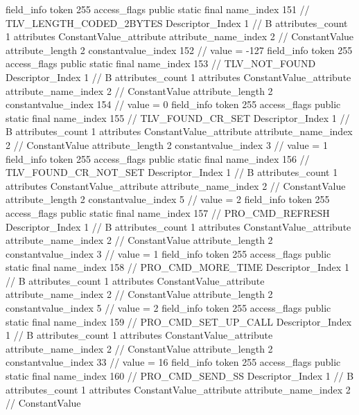 {{{{{{{				}
				}
			}
			field_info {
				token	255
				access_flags	public static final
				name_index	151		// TLV_LENGTH_CODED_2BYTES
				Descriptor_Index	1		// B
				attributes_count	1
				attributes {
				ConstantValue_attribute {
					attribute_name_index	2		// ConstantValue
					attribute_length	2
					constantvalue_index	152		// value = -127
				}
				}
			}
			field_info {
				token	255
				access_flags	public static final
				name_index	153		// TLV_NOT_FOUND
				Descriptor_Index	1		// B
				attributes_count	1
				attributes {
				ConstantValue_attribute {
					attribute_name_index	2		// ConstantValue
					attribute_length	2
					constantvalue_index	154		// value = 0
				}
				}
			}
			field_info {
				token	255
				access_flags	public static final
				name_index	155		// TLV_FOUND_CR_SET
				Descriptor_Index	1		// B
				attributes_count	1
				attributes {
				ConstantValue_attribute {
					attribute_name_index	2		// ConstantValue
					attribute_length	2
					constantvalue_index	3		// value = 1
				}
				}
			}
			field_info {
				token	255
				access_flags	public static final
				name_index	156		// TLV_FOUND_CR_NOT_SET
				Descriptor_Index	1		// B
				attributes_count	1
				attributes {
				ConstantValue_attribute {
					attribute_name_index	2		// ConstantValue
					attribute_length	2
					constantvalue_index	5		// value = 2
				}
				}
			}
			field_info {
				token	255
				access_flags	public static final
				name_index	157		// PRO_CMD_REFRESH
				Descriptor_Index	1		// B
				attributes_count	1
				attributes {
				ConstantValue_attribute {
					attribute_name_index	2		// ConstantValue
					attribute_length	2
					constantvalue_index	3		// value = 1
				}
				}
			}
			field_info {
				token	255
				access_flags	public static final
				name_index	158		// PRO_CMD_MORE_TIME
				Descriptor_Index	1		// B
				attributes_count	1
				attributes {
				ConstantValue_attribute {
					attribute_name_index	2		// ConstantValue
					attribute_length	2
					constantvalue_index	5		// value = 2
				}
				}
			}
			field_info {
				token	255
				access_flags	public static final
				name_index	159		// PRO_CMD_SET_UP_CALL
				Descriptor_Index	1		// B
				attributes_count	1
				attributes {
				ConstantValue_attribute {
					attribute_name_index	2		// ConstantValue
					attribute_length	2
					constantvalue_index	33		// value = 16
				}
				}
			}
			field_info {
				token	255
				access_flags	public static final
				name_index	160		// PRO_CMD_SEND_SS
				Descriptor_Index	1		// B
				attributes_count	1
				attributes {
				ConstantValue_attribute {
					attribute_name_index	2		// ConstantValue
}}}}}}}
